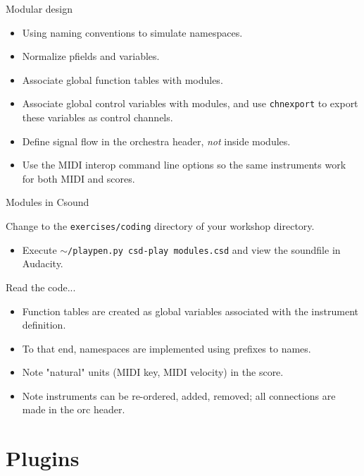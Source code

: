\documentclass{beamer}
\begin{document}
\begin{frame}{Modular design}
\begin{itemize}
\item Using naming conventions to simulate namespaces.
\item Normalize pfields and variables.
\item Associate global function tables with modules.
\item Associate global control variables with modules, and use
\texttt{chnexport} to export these variables as control channels.
\item Define signal flow in the orchestra header, \textit{not} inside modules.
\item Use the MIDI interop command line options so the same instruments work for both MIDI and scores.
\end{itemize}
\end{frame}

\begin{frame}{Modules in Csound}
\begin{example}
Change to the \texttt{exercises/coding} directory of your workshop directory.
\begin{itemize}
\item Execute \texttt{$\sim$/playpen.py csd-play modules.csd} and view the soundfile in Audacity.
\end{itemize}
Read the code...
\begin{itemize}
\item Function tables are created as global variables associated with the instrument definition.
\item To that end, namespaces are implemented using prefixes to names.
\item Note "natural" units (MIDI key, MIDI velocity) in the score.
\item Note instruments can be re-ordered, added, removed; all connections are made in the orc header.
\end{itemize}
\end{example}
\end{frame}

\section{Plugins}
\end{document}
